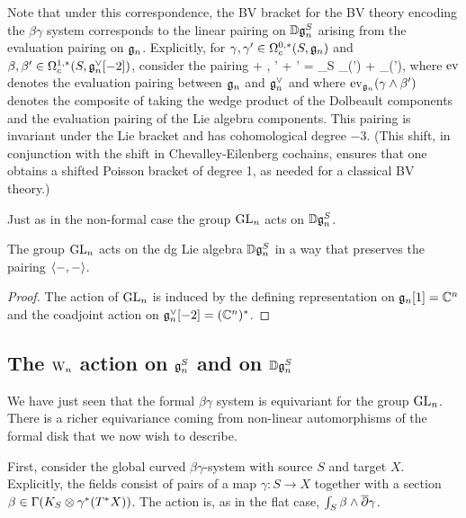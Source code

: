 Note that under this correspondence, the BV bracket for the BV theory encoding the $\beta\gamma$ system 
corresponds to the linear pairing on $\mathbb D \mathfrak g^S_n$ arising from the evaluation pairing on $\mathfrak{g}_n$. 
Explicitly, for $\gamma, \gamma' \in \Omega^{0,*}_c(S, \mathfrak g_n)$ and $\beta, \beta' \in \Omega^{1,*}_c(S, \mathfrak g_n^\vee[-2])$, 
consider the pairing
\be\label{pairing2}
\langle \gamma + \beta, \gamma' + \beta' \rangle = \int_S \ev_{\fgn}(\gamma \wedge \beta') + \ev_{\fgn}(\beta \wedge \gamma'),
\ee
where ${\rm ev}$ denotes the evaluation pairing between $\mathfrak{g}_n$ and $\mathfrak{g}_n^\vee$ and 
where ${\rm ev}_{\mathfrak{g}_n}(\gamma \wedge \beta')$ denotes the composite of taking the wedge product of the Dolbeault components 
and the evaluation pairing of the Lie algebra components.
This pairing is invariant under the Lie bracket and has cohomological degree $-3$.
(This shift, in conjunction with the shift in Chevalley-Eilenberg cochains, ensures that one obtains a shifted Poisson bracket of degree 1,
as needed for a classical BV theory.)

Just as in the non-formal case the group ${\rm GL}_n$ acts on $\mathbb D
\mathfrak g_n^S$. 

\begin{lemma}\label{GLaction} The group ${\rm GL}_n$ acts on the dg Lie algebra $\mathbb D
  \mathfrak g_n^S$ in a way that preserves the pairing $\left\langle-,-\right\rangle$. 
\end{lemma}
\begin{proof} 
The action of ${\rm GL}_n$ is induced by the defining representation on
$\mathfrak g_n [1] = \mathbb C^n$ and the coadjoint action on $\mathfrak g_n^\vee [-2] =
(\mathbb C^n)^*$. 
\end{proof}

\subsection{The ${{\rm W}_n}$ action on $\mathfrak{g}_n^S$ and on $\mathbb D\mathfrak{g}_n^S$}\label{classicalvectaction}

We have just seen that the formal $\beta\gamma$ system is equivariant
for the group ${\rm GL}_n$. There is a richer equivariance coming from
non-linear automorphisms of the formal disk that we now wish to
describe. 

First, consider the global curved $\beta \gamma$-system with source
$S$ and target $X$. Explicitly, the fields consist of pairs of a map $\gamma : S
\to X$ together with a section $\beta \in \Gamma(K_S \otimes
\gamma^*(T^*X))$. The action is, as in the flat case, $\int_S \beta
\wedge \overline{\partial} \gamma$. 

